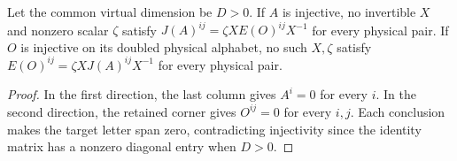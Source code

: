 \begin{lemma}
    \leanok
    \label{thm:glm_triangular_padding_gauge_separation}
    Let the common virtual dimension be $D>0$.
    If $A$ is injective, no invertible $X$ and nonzero scalar $\zeta$
    satisfy $J(A)^{ij}=\zeta X E(O)^{ij}X^{-1}$ for every physical pair.
    If $O$ is injective on its doubled physical alphabet, no such $X,\zeta$
    satisfy $E(O)^{ij}=\zeta X J(A)^{ij}X^{-1}$ for every physical pair.
\end{lemma}
\begin{proof}
    \leanok
    In the first direction, the last column gives $A^i=0$ for every $i$.
    In the second direction, the retained corner gives $O^{ij}=0$ for
    every $i,j$. Each conclusion makes the target letter span zero,
    contradicting injectivity since the identity matrix has a nonzero
    diagonal entry when $D>0$.
\end{proof}
